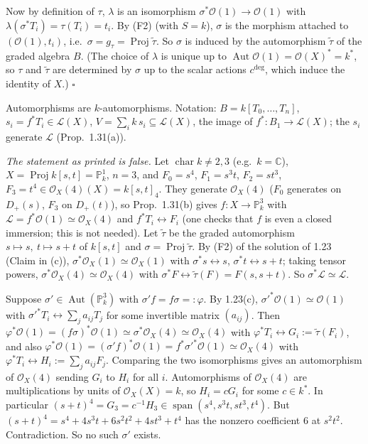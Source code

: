 \documentclass[11pt]{article}
\begin{document}
Now by definition of $\tau$, $\lambda$ is an isomorphism $\sigma^*\mathcal{O}(1)\to\mathcal{O}(1)$ with $\lambda(\sigma^*T_i)=\tau(T_i)=t_i$. By (F2) (with $S=k$), $\sigma$ is the morphism attached to $(\mathcal{O}(1),t_i)$, i.e.\ $\sigma=g_\tau=\operatorname{Proj}\tilde\tau$. So $\sigma$ is induced by the automorphism $\tilde\tau$ of the graded algebra $B$. (The choice of $\lambda$ is unique up to $\operatorname{Aut}\mathcal{O}(1)=\mathcal{O}(X)^*=k^*$, so $\tau$ and $\tilde\tau$ are determined by $\sigma$ up to the scalar actions $c^{\deg}$, which induce the identity of $X$.) \hfill$\square$

\pf
Automorphisms are $k$-automorphisms. Notation: $B=k[T_0,\dots,T_n]$, $s_i=f^*T_i\in\mathcal{L}(X)$, $V=\sum_ik\,s_i\subseteq\mathcal{L}(X)$, the image of $f^*:B_1\to\mathcal{L}(X)$; the $s_i$ generate $\mathcal{L}$ (Prop.~1.31(a)).

\emph{The statement as printed is false.} Let $\operatorname{char}k\ne2,3$ (e.g.\ $k=\mathbb{C}$), $X=\operatorname{Proj}k[s,t]=\mathbb{P}^1_k$, $n=3$, and $F_0=s^4$, $F_1=s^3t$, $F_2=st^3$, $F_3=t^4\in\mathcal{O}_X(4)(X)=k[s,t]_4$. They generate $\mathcal{O}_X(4)$ ($F_0$ generates on $D_+(s)$, $F_3$ on $D_+(t)$), so Prop.~1.31(b) gives $f:X\to\mathbb{P}^3_k$ with $\mathcal{L}=f^*\mathcal{O}(1)\simeq\mathcal{O}_X(4)$ and $f^*T_i\leftrightarrow F_i$ (one checks that $f$ is even a closed immersion; this is not needed). Let $\tilde\tau$ be the graded automorphism $s\mapsto s,\ t\mapsto s+t$ of $k[s,t]$ and $\sigma=\operatorname{Proj}\tilde\tau$. By (F2) of the solution of 1.23 (Claim in (c)), $\sigma^*\mathcal{O}_X(1)\simeq\mathcal{O}_X(1)$ with $\sigma^*s\leftrightarrow s$, $\sigma^*t\leftrightarrow s+t$; taking tensor powers, $\sigma^*\mathcal{O}_X(4)\simeq\mathcal{O}_X(4)$ with $\sigma^*F\leftrightarrow\tilde\tau(F)=F(s,s+t)$. So $\sigma^*\mathcal{L}\simeq\mathcal{L}$.

Suppose $\sigma'\in\operatorname{Aut}(\mathbb{P}^3_k)$ with $\sigma'f=f\sigma=:\varphi$. By 1.23(c), $\sigma'^*\mathcal{O}(1)\simeq\mathcal{O}(1)$ with $\sigma'^*T_i\leftrightarrow\sum_ja_{ij}T_j$ for some invertible matrix $(a_{ij})$. Then $\varphi^*\mathcal{O}(1)=(f\sigma)^*\mathcal{O}(1)\simeq\sigma^*\mathcal{O}_X(4)\simeq\mathcal{O}_X(4)$ with $\varphi^*T_i\leftrightarrow G_i:=\tilde\tau(F_i)$, and also $\varphi^*\mathcal{O}(1)=(\sigma'f)^*\mathcal{O}(1)=f^*\sigma'^*\mathcal{O}(1)\simeq\mathcal{O}_X(4)$ with $\varphi^*T_i\leftrightarrow H_i:=\sum_ja_{ij}F_j$. Comparing the two isomorphisms gives an automorphism of $\mathcal{O}_X(4)$ sending $G_i$ to $H_i$ for all $i$. Automorphisms of $\mathcal{O}_X(4)$ are multiplications by units of $\mathcal{O}_X(X)=k$, so $H_i=cG_i$ for some $c\in k^*$. In particular $(s+t)^4=G_3=c^{-1}H_3\in\operatorname{span}(s^4,s^3t,st^3,t^4)$. But $(s+t)^4=s^4+4s^3t+6s^2t^2+4st^3+t^4$ has the nonzero coefficient $6$ at $s^2t^2$. Contradiction. So no such $\sigma'$ exists.
\end{document}
